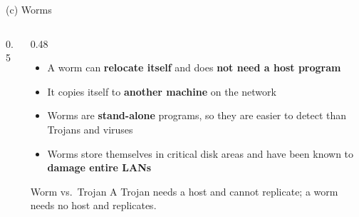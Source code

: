 \documentclass[aspectratio=169,11pt,xcolor={table}]{beamer}
\begin{document}
\begin{frame}{(c) Worms}
  \begin{columns}[c]
    \begin{column}{0.5\textwidth}
      \centering
    \end{column}
    \begin{column}{0.48\textwidth}
      \begin{itemize}\small\setlength{\itemsep}{4pt}
        \item A worm can \textbf{relocate itself} and does \textbf{not need a host program}
        \item It copies itself to \textbf{another machine} on the network
        \item Worms are \textbf{stand-alone} programs, so they are easier to detect than Trojans and viruses
        \item Worms store themselves in critical disk areas and have been known to \textbf{damage entire LANs}
      \end{itemize}
      \vspace{1mm}
      \begin{block}{Worm vs.\ Trojan}
        \small A Trojan needs a host and cannot replicate; a worm needs no host and replicates.
      \end{block}
    \end{column}
  \end{columns}
\end{frame}
\end{document}

